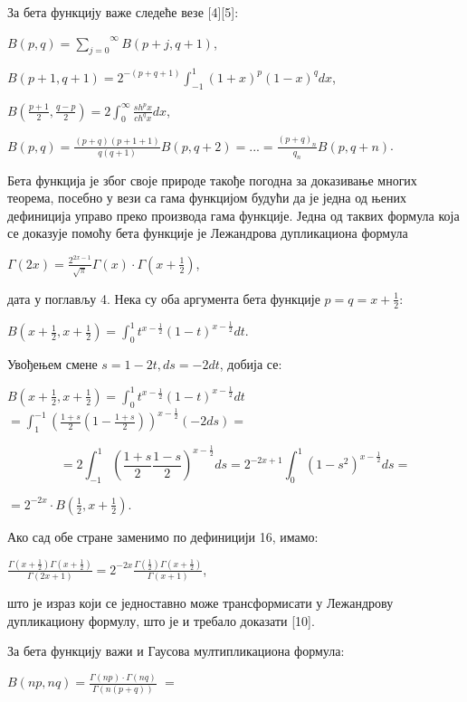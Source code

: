 За бета функцију важе следеће везе {[}4{]}{[}5{]}:

\(B(p,q) = \overset{\infty}{\sum_{j = 0}}B(p + j,q + 1)\),

\(B(p + 1,q + 1) = 2^{- (p + q + 1)}\int_{- 1}^{1}{(1 + x)}^{p}{(1 - x)}^{q}dx\),

\(B(\frac{p + 1}{2},\frac{q - p}{2}) = 2\int_{0}^{\infty}\frac{{sh}^{p}x}{{ch}^{q}x}dx\),

\(B(p,q) = \frac{(p + q)(p + 1 + 1)}{q(q + 1)}B(p,q + 2) = ... = \frac{{(p + q)}_{n}}{q_{n}}B(p,q + n)\).

Бета функција је због своје природе такође погодна за доказивање многих
теорема, посебно у вези са гама функцијом будући да је једна од њених
дефиниција управо преко производа гама функције. Једна од таквих формула
која се доказује помоћу бета функције је Лежандрова дупликациона формула

\(\Gamma(2x) = \frac{2^{2x - 1}}{\sqrt{\pi}}\Gamma(x) \cdot \Gamma(x + \frac{1}{2})\),

дата у поглављу 4. Нека су оба аргумента бета функције
\(p = q = x + \frac{1}{2}\):

\(B(x + \frac{1}{2},x + \frac{1}{2}) = \int_{0}^{1}t^{x - \frac{1}{2}}{(1 - t)}^{x - \frac{1}{2}}dt\).

Увођењем смене \(s = 1 - 2t,ds = - 2dt\), добија се:

\(B(x + \frac{1}{2},x + \frac{1}{2}) = \int_{0}^{1}t^{x - \frac{1}{2}}{(1 - t)}^{x - \frac{1}{2}}dt\)
\(= \int_{1}^{- 1}\left( \frac{1 + s}{2}\left( 1 - \frac{1 + s}{2} \right) \right)^{x - \frac{1}{2}}( - 2ds) =\)

\[= 2\int_{- 1}^{1}{(\frac{1 + s}{2}\frac{1 - s}{2})}^{x - \frac{1}{2}}ds = 2^{- 2x + 1}\int_{0}^{1}{(1 - s^{2})}^{x - \frac{1}{2}}ds =\]

\(= 2^{- 2x} \cdot B(\frac{1}{2},x + \frac{1}{2})\).

Ако сад обе стране заменимо по дефиницији 16, имамо:

\(\frac{\Gamma(x + \frac{1}{2})\Gamma(x + \frac{1}{2})}{\Gamma(2x + 1)} = 2^{- 2x}\frac{\Gamma(\frac{1}{2})\Gamma(x + \frac{1}{2})}{\Gamma(x + 1)}\),

што је израз који се једноставно може трансформисати у Лежандрову
дупликациону формулу, што је и требало доказати {[}10{]}.

За бета функцију важи и Гаусова мултипликациона формула:

\(B(np,nq) = \frac{\Gamma(np) \cdot \Gamma(nq)}{\Gamma(n(p + q))}\)
\(=\)

